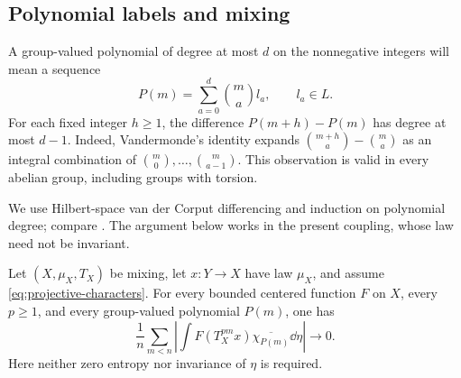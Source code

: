 \subsection{Polynomial labels and mixing}

A group-valued polynomial of degree at most $d$ on the nonnegative
integers will mean a sequence
\[
 P(m)=\sum_{a=0}^d\binom ma l_a,\qquad l_a\in L.
\]
For each fixed integer $h\ge1$, the difference $P(m+h)-P(m)$ has degree
at most $d-1$. Indeed, Vandermonde's identity expands
$\binom{m+h}{a}-\binom ma$ as an integral combination of
$\binom m0,\ldots,\binom m{a-1}$. This observation is valid in every
abelian group, including groups with torsion.

We use Hilbert-space van der Corput differencing and induction on
polynomial degree; compare \cite[Theorems~1.4--1.5 and p.~339]{Bergelson1987}.
The argument below works in the present coupling, whose law need not
be invariant.

\begin{lemma}
\label{lem:polynomial-cancellation}
Let $(X,\mu_X,T_X)$ be mixing, let $x:Y\to X$ have law $\mu_X$, and
assume \eqref{eq:projective-characters}. For every bounded centered
function $F$ on $X$, every $p\ge1$, and every group-valued polynomial
$P(m)$, one has
\[
 \frac1n\sum_{m<n}
 \left|\int F(T_X^{pm}x)\overline{\chi_{P(m)}}\dd\eta\right|
 \longrightarrow0.
\]
Here neither zero entropy nor invariance of $\eta$ is required.
\end{lemma}

